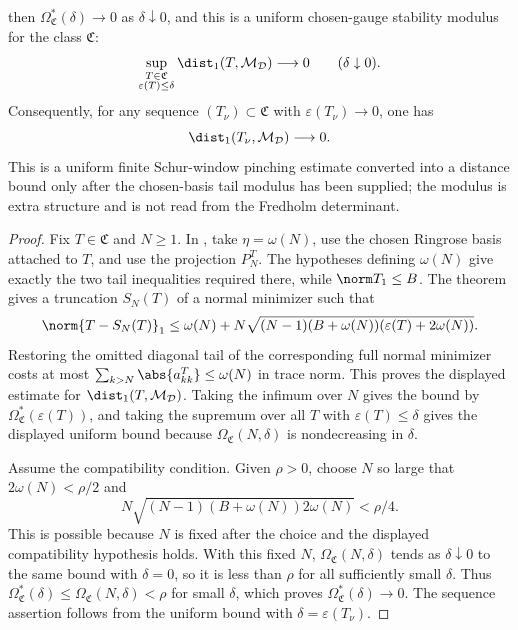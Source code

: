 \begin{theorem}
\begin{equation*}
  \end{equation*}
  then \(\Omega_{\mathfrak C}^{\ast}(\delta)\to0\) as
  \(\delta\downarrow0\), and this is a uniform chosen-gauge stability
  modulus for the class \(\mathfrak C\):
  \[
    \sup_{\substack{T\in\mathfrak C\\ \varepsilon(T)\le\delta}}
      \dist_1(T,\mathcal M_{\mathcal D})
    \longrightarrow0
    \qquad(\delta\downarrow0).
  \]
  Consequently, for any sequence \((T_\nu)\subset\mathfrak C\) with
  \(\varepsilon(T_\nu)\to0\), one has
  \[
    \dist_1(T_\nu,\mathcal M_{\mathcal D})\longrightarrow0 .
  \]
  This is a uniform finite Schur-window pinching estimate converted into a
  distance bound only after the chosen-basis tail modulus has been supplied; the
  modulus is extra structure and is not read from the Fredholm determinant.
\end{theorem}

\begin{proof}
  Fix \(T\in\mathfrak C\) and \(N\ge1\).  In
  , take
  \(\eta=\omega(N)\), use the chosen Ringrose basis attached to \(T\), and
  use the projection \(P_N^T\).  The hypotheses defining \(\omega(N)\) give
  exactly the two tail inequalities required there, while
  \(\norm T_1\le B\).  The theorem gives a truncation \(S_N(T)\) of a normal
  minimizer such that
  \[
    \norm{T-S_N(T)}_1
    \le
    \omega(N)+
    N\sqrt{(N-1)(B+\omega(N))
      (\varepsilon(T)+2\omega(N))}.
  \]
  Restoring the omitted diagonal tail of the corresponding full normal
  minimizer costs at most
  \(\sum_{k>N}\abs{a_{kk}^T}\le\omega(N)\) in trace norm.  This proves the
  displayed estimate for \(\dist_1(T,\mathcal M_{\mathcal D})\).  Taking
  the infimum over \(N\) gives the bound by
  \(\Omega_{\mathfrak C}^{\ast}(\varepsilon(T))\), and taking the supremum
  over all \(T\) with \(\varepsilon(T)\le\delta\) gives the displayed uniform
  bound because \(\Omega_{\mathfrak C}(N,\delta)\) is nondecreasing in
  \(\delta\).

  Assume the compatibility condition. Given \(\rho>0\), choose \(N\) so large
  that
  \(2\omega(N)<\rho/2\) and
  \[
    N\sqrt{(N-1)(B+\omega(N))2\omega(N)}<\rho/4 .
  \]
  This is possible because \(N\) is fixed after the choice and
  the displayed compatibility hypothesis holds.  With this fixed \(N\),
  \(\Omega_{\mathfrak C}(N,\delta)\) tends as \(\delta\downarrow0\) to the
  same bound with \(\delta=0\), so it is less than \(\rho\) for all
  sufficiently small \(\delta\).  Thus
  \(\Omega_{\mathfrak C}^{\ast}(\delta)\le
  \Omega_{\mathfrak C}(N,\delta)<\rho\) for small \(\delta\), which proves
  \(\Omega_{\mathfrak C}^{\ast}(\delta)\to0\). The sequence assertion follows
  from the uniform bound with \(\delta=\varepsilon(T_\nu)\).
\end{proof}

